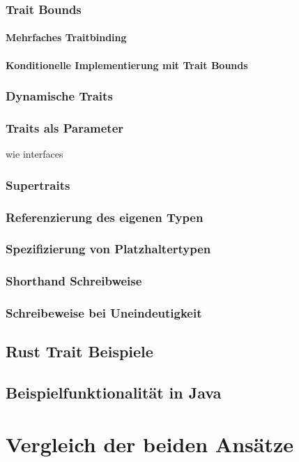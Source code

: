 \documentclass[a4paper, 1ppt]{article}
\begin{document}
\subsubsection{Trait Bounds}
\paragraph{Mehrfaches Traitbinding}
\paragraph{Konditionelle Implementierung mit Trait Bounds}
\subsubsection{Dynamische Traits}
\subsubsection{Traits als Parameter}
wie interfaces
\subsubsection{Supertraits}
\subsubsection{Referenzierung des eigenen Typen}
\subsubsection{Spezifizierung von Platzhaltertypen}
\subsubsection{Shorthand Schreibweise}
\subsubsection{Schreibeweise bei Uneindeutigkeit}
\subsection{Rust Trait Beispiele}
\subsection{Beispielfunktionalität in Java}
\section{Vergleich der beiden Ansätze}



\end{document}
